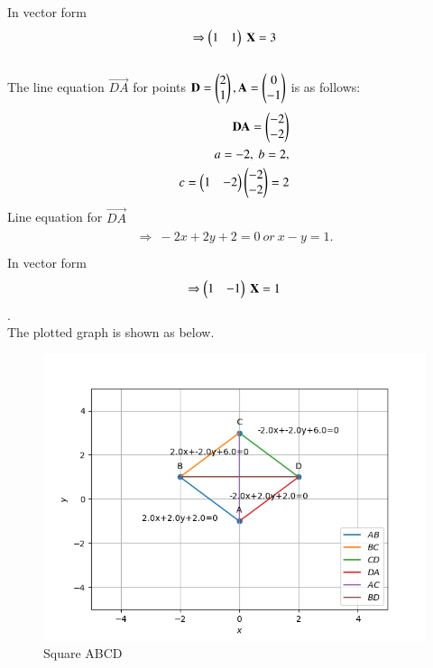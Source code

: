 \documentclass[journal,12pt,twocolumn]{IEEEtran}
\begin{document}
In vector form
\begin{align}
\begin{split}
\Rightarrow \begin{pmatrix}1&1\end{pmatrix}\ \mathbf{X}=3
\end{split}
\end{align}
\\
The line equation $\vec{DA}$ for points $\mathbf{D} = \begin{pmatrix}2\\1\end{pmatrix}, \mathbf{A} = \begin{pmatrix}0\\-1\end{pmatrix}$ is as follows:\\
\begin{align}
\begin{split}
\mathbf{DA} = \begin{pmatrix}-2\\-2\end{pmatrix}\\
a=-2,\ b=2,\\
c=\begin{pmatrix}1 & -2\end{pmatrix} \begin{pmatrix}-2\\-2\end{pmatrix}=2\\
\end{split}
\end{align}
Line equation for $\vec{DA}$
\begin{align}
\begin{split}
\Rightarrow\ -2x+2y+2=0 \ or \ x-y=1. \\
\end{split}
\end{align}
In vector form
\begin{align}
\begin{split}
\Rightarrow \begin{pmatrix}1&-1\end{pmatrix}\ \mathbf{X}=1
\end{split}
\end{align}.
\\
The plotted graph is shown as below.
\begin{figure}[!ht]
    \centering
    \includegraphics[width=\columnwidth]{assignment2_using affine.png}
    \caption{Square ABCD}
    \label{fig:Square ABCD}
\end{figure}
\end{document}

